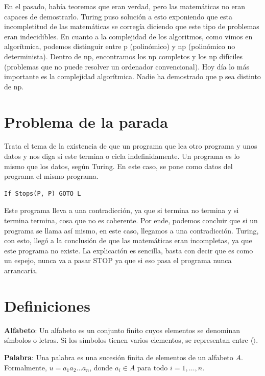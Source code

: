 \documentclass[12pt]{book} %
\begin{document}
En el pasado, había teoremas que eran verdad, pero las matemáticas no
eran capaces de demostrarlo. Turing puso solución a esto exponiendo que
esta incompletitud de las matemáticas se corregía diciendo que este tipo
de problemas eran indecidibles. En cuanto a la complejidad de los
algoritmos, como vimos en algorítmica, podemos distinguir entre p
(polinómico) y np (polinómico no determinista). Dentro de np,
encontramos los np completos y los np difíciles (problemas que no puede
resolver un ordenador convencional). Hoy día lo más importante es la
complejidad algorítmica. Nadie ha demostrado que p sea distinto de np.

\hypertarget{problema-de-la-parada}{%
\section{Problema de la parada}\label{problema-de-la-parada}}

Trata el tema de la existencia de que un programa que lea otro programa
y unos datos y nos diga si este termina o cicla indefinidamente. Un
programa es lo mismo que los datos, según Turing. En este caso, se pone
como datos del programa el mismo programa.

\begin{lstlisting}[language=Python]
If Stops(P, P) GOTO L
\end{lstlisting}

Este programa lleva a una contradicción, ya que si termina no termina y
si termina termina, cosa que no es coherente. Por ende, podemos concluir
que si un programa se llama así mismo, en este caso, llegamos a una
contradicción. Turing, con esto, llegó a la conclusión de que las
matemáticas eran incompletas, ya que este programa no existe. La
explicación es sencilla, basta con decir que es como un espejo, nunca va
a pasar STOP ya que si eso pasa el programa nunca arrancaría.

\hypertarget{definiciones}{%
\section{Definiciones}\label{definiciones}}

\begin{definicion}
\textbf{Alfabeto}: Un alfabeto es un conjunto finito cuyos elementos se denominan símbolos o letras. Si los símbolos tienen varios elementos, se representan entre $\langle \rangle$.  
\end{definicion}

\begin{definicion}
\textbf{Palabra}: Una palabra es una sucesión finita de elementos de un alfabeto $A$. Formalmente, $u = a_1 a_2 \ldots a_n$, donde $a_i \in A$ para todo $i = 1, \ldots, n$.  
\end{definicion}
\end{document}
